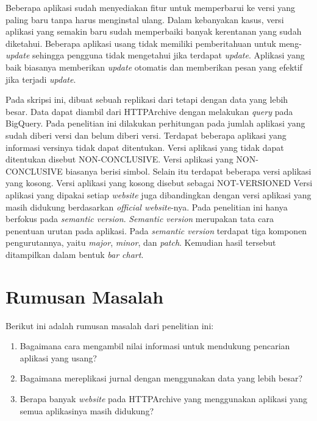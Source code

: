 Beberapa aplikasi sudah menyediakan fitur untuk memperbarui ke versi yang paling baru tanpa harus menginstal ulang. Dalam kebanyakan kasus, versi aplikasi yang semakin baru sudah memperbaiki banyak kerentanan yang sudah diketahui. Beberapa aplikasi usang tidak memiliki pemberitahuan untuk meng-\textit{update} sehingga pengguna tidak mengetahui jika terdapat \textit{update}. Aplikasi yang baik biasanya memberikan \textit{update} otomatis dan memberikan pesan yang efektif jika terjadi \textit{update}. 

Pada skripsi ini, dibuat sebuah replikasi dari \cite{pascal} tetapi dengan data yang lebih besar. Data dapat diambil dari HTTPArchive dengan melakukan \textit{query} pada BigQuery. Pada penelitian ini dilakukan perhitungan pada jumlah aplikasi yang sudah diberi versi dan belum diberi versi. Terdapat beberapa aplikasi yang informasi versinya tidak dapat ditentukan. Versi aplikasi yang tidak dapat ditentukan disebut NON-CONCLUSIVE. Versi aplikasi yang NON-CONCLUSIVE biasanya berisi simbol. Selain itu terdapat beberapa versi aplikasi yang kosong. Versi aplikasi yang kosong disebut sebagai NOT-VERSIONED Versi aplikasi yang dipakai setiap \textit{website} juga dibandingkan dengan versi aplikasi yang masih didukung berdasarkan \textit{official website}-nya. Pada penelitian ini hanya berfokus pada \textit{semantic version}. \textit{Semantic version} merupakan tata cara penentuan urutan pada aplikasi. Pada \textit{semantic version} terdapat tiga komponen pengurutannya, yaitu \textit{major}, \textit{minor}, dan \textit{patch}. Kemudian hasil tersebut ditampilkan dalam bentuk \textit{bar chart}.


\section{Rumusan Masalah}
\label{sec:rumusan}
Berikut ini adalah rumusan masalah dari penelitian ini:
\begin{enumerate}
	\item Bagaimana cara mengambil nilai informasi untuk mendukung pencarian aplikasi yang usang?
	\item Bagaimana mereplikasi jurnal \cite{pascal} dengan menggunakan data yang lebih besar?
	\item Berapa banyak \textit{website} pada HTTPArchive yang menggunakan aplikasi yang semua aplikasinya masih didukung?
\end{enumerate}


